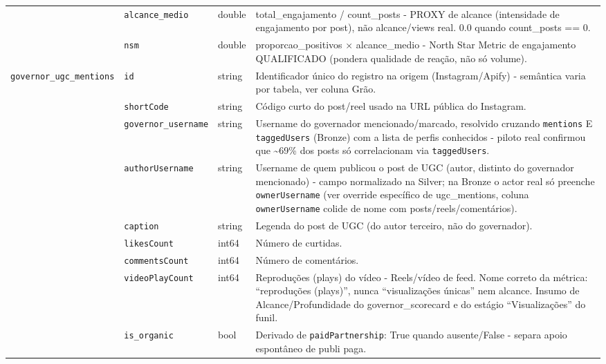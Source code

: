 \begin{footnotesize}
\begin{longtable}{p{3.2cm}p{3.0cm}p{2.0cm}p{6.0cm}}
\texttt{} & \texttt{alcance\_\allowbreak{}medio} & double & total\_\allowbreak{}engajamento /\allowbreak{} count\_\allowbreak{}posts - PROXY de alcance (intensidade de engajamento por post), não alcance/\allowbreak{}views real. 0.0 quando count\_\allowbreak{}posts == 0. \\
\texttt{} & \texttt{nsm} & double & proporcao\_\allowbreak{}positivos × alcance\_\allowbreak{}medio - North Star Metric de engajamento QUALIFICADO (pondera qualidade de reação, não só volume). \\
\texttt{governor\_\allowbreak{}ugc\_\allowbreak{}mentions} & \texttt{id} & string & Identificador único do registro na origem (Instagram/\allowbreak{}Apify) - semântica varia por tabela, ver coluna Grão. \\
\texttt{} & \texttt{shortCode} & string & Código curto do post/\allowbreak{}reel usado na URL pública do Instagram. \\
\texttt{} & \texttt{governor\_\allowbreak{}username} & string & Username do governador mencionado/\allowbreak{}marcado, resolvido cruzando \texttt{mentions} E \texttt{taggedUsers} (Bronze) com a lista de perfis conhecidos - piloto real confirmou que \textasciitilde{}69\% dos posts só correlacionam via \texttt{taggedUsers}. \\
\texttt{} & \texttt{authorUsername} & string & Username de quem publicou o post de UGC (autor, distinto do governador mencionado) - campo normalizado na Silver; na Bronze o actor real só preenche \texttt{ownerUsername} (ver override específico de ugc\_\allowbreak{}mentions, coluna \texttt{ownerUsername} colide de nome com posts/\allowbreak{}reels/\allowbreak{}comentários). \\
\texttt{} & \texttt{caption} & string & Legenda do post de UGC (do autor terceiro, não do governador). \\
\texttt{} & \texttt{likesCount} & int64 & Número de curtidas. \\
\texttt{} & \texttt{commentsCount} & int64 & Número de comentários. \\
\texttt{} & \texttt{videoPlayCount} & int64 & Reproduções (plays) do vídeo - Reels/\allowbreak{}vídeo de feed. Nome correto da métrica: ``reproduções (plays)'', nunca ``visualizações únicas'' nem alcance. Insumo de Alcance/\allowbreak{}Profundidade do governor\_\allowbreak{}scorecard e do estágio ``Visualizações'' do funil. \\
\texttt{} & \texttt{is\_\allowbreak{}organic} & bool & Derivado de \texttt{paidPartnership}: True quando ausente/\allowbreak{}False - separa apoio espontâneo de publi paga. \\

\end{longtable}
\end{footnotesize}
